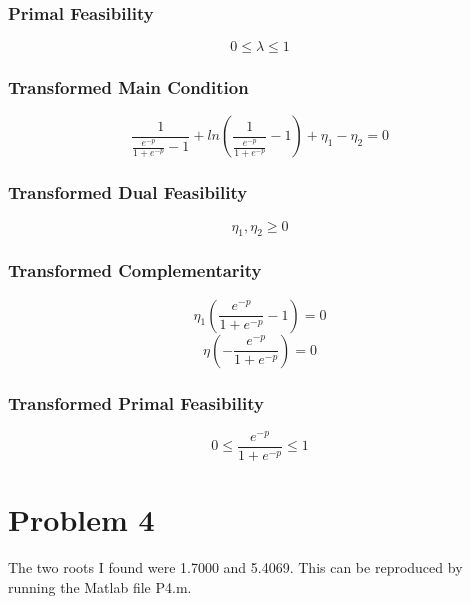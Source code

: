 \documentclass{article}
\begin{document}
\subsubsection{Primal Feasibility}

$$0 \le \lambda \le 1$$

\subsubsection{Transformed Main Condition}

$$\frac{1}{\frac{e^{-p}}{1 + e^{-p}} - 1} + ln(\frac{1}{\frac{e^{-p}}{1 + e^{-p}}} - 1) + \eta_1 - \eta _2 = 0$$

\subsubsection{Transformed Dual Feasibility}

$$\eta_1, \eta_2 \ge 0$$

\subsubsection{Transformed Complementarity}

$$\eta_1(\frac{e^{-p}}{1 + e^{-p}} - 1) = 0$$
$$\eta(-\frac{e^{-p}}{1 + e^{-p}}) = 0$$

\subsubsection{Transformed Primal Feasibility}

$$0 \le \frac{e^{-p}}{1 + e^{-p}} \le 1$$



\section{Problem 4}

The two roots I found were 1.7000 and 5.4069. This can be reproduced by running the Matlab file P4.m.
\end{document}
